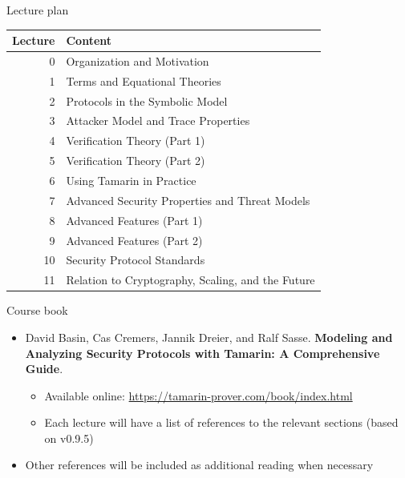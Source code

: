 \documentclass[11pt,aspectratio=169]{beamer}
\begin{document}
\begin{frame}[fragile]{Lecture plan}
    \begin{table}[]\scriptsize
        \vspace*{-.2cm}
        \begin{tabular}{rl}
            \textbf{Lecture} & \textbf{Content} \\
            \toprule
            0 & Organization and Motivation \\ \midrule
            1 & Terms and Equational Theories \\
            2 & Protocols in the Symbolic Model \\
            3 & Attacker Model and Trace Properties \\
            4 & Verification Theory (Part 1) \\
            5 & Verification Theory (Part 2) \\ \midrule
            6 & Using Tamarin in Practice \\
            7 & Advanced Security Properties and Threat Models \\
            8 & Advanced Features (Part 1) \\
            9 & Advanced Features (Part 2) \\ \midrule
            10 & Security Protocol Standards \\
            11 & Relation to Cryptography, Scaling, and the Future \\
            \bottomrule
        \end{tabular}
    \end{table}
\end{frame}

\begin{frame}[fragile]{Course book}
    \begin{itemize}
        \item David Basin, Cas Cremers, Jannik Dreier, and Ralf Sasse.
              \textbf{Modeling and Analyzing Security Protocols with Tamarin:
                      A Comprehensive Guide}.
        \begin{itemize}
            \item Available online:
                  \url{https://tamarin-prover.com/book/index.html}
            \item Each lecture will have a list of references to the relevant
                  sections (based on v0.9.5)
        \end{itemize}
    \item Other references will be included as additional reading when necessary
    \end{itemize}
\end{frame}
\end{document}
